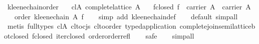 \begin{isabellebody}
\endisatagproof
{\isafoldproof}%
%
\isadelimproof
\isanewline
%
\endisadelimproof
\isanewline
{}\isamarkupfalse%
\ kleene{}chain{}order{}\isanewline
\ \ \ cl{}A{}\ {}complete{}lattice\ A{}\isanewline
\ \ \ f{}closed{}\ {}f\ {}\ carrier\ A\ {}\ carrier\ A{}\isanewline
\ \ \ {}order\ {}kleene{}chain\ A\ f{}{}\isanewline
%
\isadelimproof
\ \ %
\endisadelimproof
%
\isatagproof
{}\isamarkupfalse%
\ {}simp\ add{}\ kleene{}chain{}def{}\isanewline
\ \ \isamarkupfalse%
\ {}default{}\ simp{}all{}\isanewline
\ \ \isamarkupfalse%
\ {}metis\ {}full{}types{}\ cl{}A\ cl{}to{}cjs\ cl{}to{}order\ typed{}application\ complete{}join{}semilattice{}bot{}closed\ f{}closed\ iter{}closed\ order{}order{}refl{}\isanewline
\ \ \isamarkupfalse%
\ safe\isanewline
\ \ \isamarkupfalse%
\ simp{}all\isanewline

\end{isabellebody}
